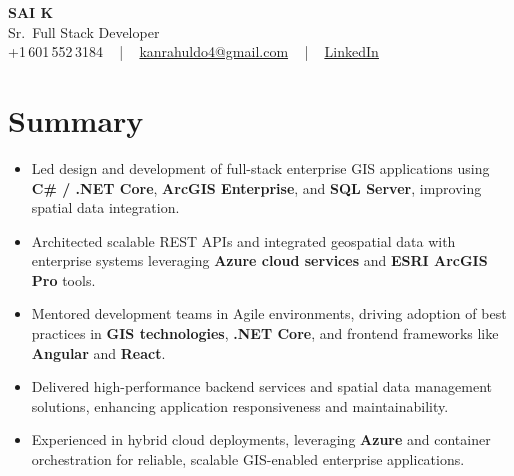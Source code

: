 \documentclass[letterpaper,11pt]{article}
\newcommand{\resumeItem}[1]{
  \item\footnotesize{
    {#1 \vspace{-2pt}}
  }
}
\newcommand{\resumeItemListStart}{\begin{itemize}[leftmargin=*]}
\newcommand{\resumeItemListEnd}{\end{itemize}\vspace{-5pt}}
\begin{document}
\begin{center}
    {\fontsize{14pt}{12pt}\selectfont \textbf{\MakeUppercase{Sai K}}}\\ \vspace{2pt}
    \fontsize{10pt}{12pt}\selectfont Sr.\ Full Stack Developer\\ \vspace{2pt}
    \fontsize{10pt}{12pt}\selectfont +1\,601\,552\,3184 ~ | ~
    \href{mailto:kanrahuldo4@gmail.com}{kanrahuldo4@gmail.com} ~ | ~
    \href{https://www.linkedin.com/in/srrrk/}{\color{blue}\underline{LinkedIn}}
    \vspace{-10pt}
\end{center}

\section{Summary}
\fontsize{9pt}{10pt}\selectfont
\resumeItemListStart
  \resumeItem{Led design and development of full-stack enterprise GIS applications using \textbf{C\# / .NET Core}, \textbf{ArcGIS Enterprise}, and \textbf{SQL Server}, improving spatial data integration.}
  \resumeItem{Architected scalable REST APIs and integrated geospatial data with enterprise systems leveraging \textbf{Azure cloud services} and \textbf{ESRI ArcGIS Pro} tools.}
  \resumeItem{Mentored development teams in Agile environments, driving adoption of best practices in \textbf{GIS technologies}, \textbf{.NET Core}, and frontend frameworks like \textbf{Angular} and \textbf{React}.}
  \resumeItem{Delivered high-performance backend services and spatial data management solutions, enhancing application responsiveness and maintainability.}
  \resumeItem{Experienced in hybrid cloud deployments, leveraging \textbf{Azure} and container orchestration for reliable, scalable GIS-enabled enterprise applications.}
\resumeItemListEnd
\vspace{-6pt}

\end{document}
